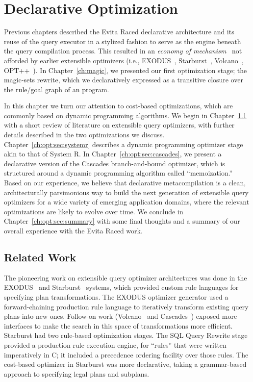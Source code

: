 \chapter[Declarative Optimization]{Declarative Optimization}
\label{ch:opt}

Previous chapters described the Evita Raced declarative architecture and its
reuse of the query executor in a stylized fashion to serve as the engine
beneath the query compilation process.  This resulted in an {\em economy of
mechanism}~\cite{Saltzer75theprotection} not afforded by earlier extensible
optimizers (i.e., EXODUS~\cite{exodus}, Starburst~\cite{phh92},
Volcano~\cite{volcano}, OPT++~\cite{opt++}).  In Chapter~\ref{ch:magic}, we
presented our first optimization stage; the magic-sets rewrite, which we
declaratively expressed as a transitive closure over the rule/goal graph of an
\OVERLOG program.

In this chapter we turn our attention to cost-based optimizations, which are
commonly based on dynamic programming algorithms.  We begin in
Chapter~\ref{ch:opt:sec:related} with a short review of literature on
extensible query optimizers, with further details described in the two
optimizations we discuss.  Chapter~\ref{ch:opt:sec:systemr} describes a dynamic
programming optimizer stage akin to that of System R.  In
Chapter~\ref{ch:opt:sec:cascades}, we present a declarative version of the
Cascades branch-and-bound optimizer, which is structured around a dynamic
programming algorithm called ``memoization.'' Based on our experience, we
believe that declarative metacompilation is a clean, architecturally
parsimonious way to build the next generation of extensible query optimizers
for a wide variety of emerging application domains, where the relevant
optimizations are likely to evolve over time.  We conclude in
Chapter~\ref{ch:opt:sec:summary} with some final thoughts and a summary of our
overall experience with the Evita Raced work.

\section{Related Work}
\label{ch:opt:sec:related}

The pioneering work on extensible query optimizer architectures was done in the
EXODUS~\cite{exodus} and Starburst~\cite{lohman,phh92} systems, which provided
custom rule languages for specifying plan transformations.  The EXODUS
optimizer generator used a forward-chaining production rule language to iteratively
transform existing query plans into new ones.  Follow-on work
(Volcano~\cite{volcano} and Cascades~\cite{cascades}) exposed more interfaces
to make the search in this space of transformations more efficient.  Starburst
had two rule-based optimization stages.  The SQL Query Rewrite stage provided a
production rule execution engine, for ``rules'' that were written imperatively
in C; it included a precedence ordering facility over those rules.  The
cost-based optimizer in Starburst was more declarative, taking a grammar-based
approach to specifying legal plans and subplans.

